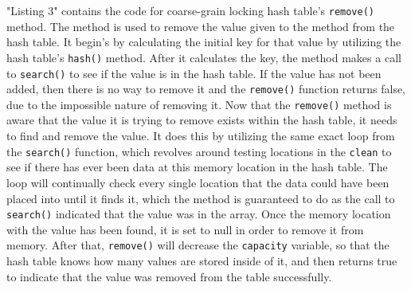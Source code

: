 \documentclass[conference]{IEEEtran}
\begin{document}
"Listing 3" contains the code for coarse-grain locking hash table's \verb|remove()| method. The method is used to remove the value given to the method from the
hash table. It begin's by calculating the initial key for that value by utilizing the hash table's \verb|hash()| method. After it calculates the key, the method
makes a call to \verb|search()| to see if the value is in the hash table. If the value has not been added, then there is no way to remove it and the \verb|remove()|
function returns false, due to the impossible nature of removing it. Now that the \verb|remove()| method is aware that the value it is trying to remove
exists within the hash table, it needs to find and remove the value. It does this by utilizing the same exact loop from the \verb|search()| function, which 
revolves around testing locations in the \verb|clean| to see if there has ever been data at this memory location in the hash table. The loop will continually check
every single location that the data could have been placed into until it finds it, which the method is guaranteed to do as the call to \verb|search()| indicated
that the value was in the array. Once the memory location with the value has been found, it is set to null in order to remove it from memory. After that, \verb|remove()|
will decrease the \verb|capacity| variable, so that the hash table knows how many values are stored inside of it, and then returns true to indicate that the value
was removed from the table successfully.
\end{document}
